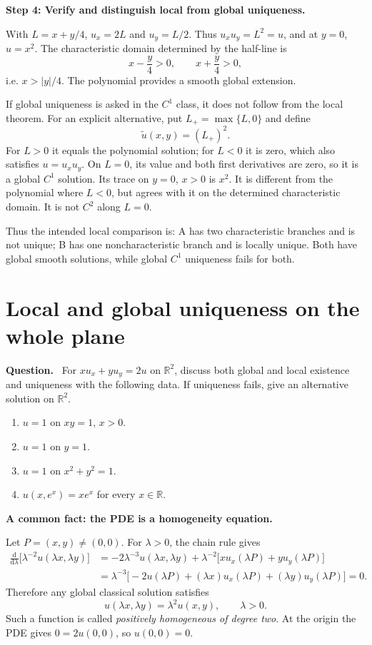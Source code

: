 \documentclass[11pt,a4paper]{article}
\newcommand{\R}{\mathbb R}
\newcommand{\step}[1]{\par\medskip\textbf{#1}\par}
\newenvironment{question}{\par\smallskip\begingroup\color{ink}\textbf{Question.}\ }{\par\endgroup\medskip}
\newcommand{\problem}[1]{\clearpage\section{#1}}
\begin{document}
\step{Step 4: Verify and distinguish local from global uniqueness.}
With $L=x+y/4$, $u_x=2L$ and $u_y=L/2$. Thus $u_xu_y=L^2=u$, and at $y=0$, $u=x^2$. The characteristic domain determined by the half-line is
\[
 x-\frac y4>0,\qquad x+\frac y4>0,
\]
i.e. $x>|y|/4$. The polynomial provides a smooth global extension.

If global uniqueness is asked in the $C^1$ class, it does not follow from the local theorem. For an explicit alternative, put $L_+=\max\{L,0\}$ and define
\[
 \widetilde u(x,y)=(L_+)^2.
\]
For $L>0$ it equals the polynomial solution; for $L<0$ it is zero, which also satisfies $u=u_xu_y$. On $L=0$, its value and both first derivatives are zero, so it is a global $C^1$ solution. Its trace on $y=0$, $x>0$ is $x^2$. It is different from the polynomial where $L<0$, but agrees with it on the determined characteristic domain. It is not $C^2$ along $L=0$.

Thus the intended local comparison is: A has two characteristic branches and is not unique; B has one noncharacteristic branch and is locally unique. Both have global smooth solutions, while global $C^1$ uniqueness fails for both.

\problem{Local and global uniqueness on the whole plane}
\begin{question}
For $xu_x+yu_y=2u$ on $\R^2$, discuss both global and local existence and uniqueness with the following data. If uniqueness fails, give an alternative solution on $\R^2$.
\begin{enumerate}[label=(\alph*)]
\item $u=1$ on $xy=1$, $x>0$.
\item $u=1$ on $y=1$.
\item $u=1$ on $x^2+y^2=1$.
\item $u(x,e^x)=xe^x$ for every $x\in\R$.
\end{enumerate}
\end{question}
\step{A common fact: the PDE is a homogeneity equation.}
Let $P=(x,y)\ne(0,0)$. For $\lambda>0$, the chain rule gives
\begin{align*}
 \frac{\mathrm d}{\mathrm d\lambda}\bigl[\lambda^{-2}u(\lambda x,\lambda y)\bigr]
 &=-2\lambda^{-3}u(\lambda x,\lambda y)
   +\lambda^{-2}\bigl[xu_x(\lambda P)+yu_y(\lambda P)\bigr]\\
 &=\lambda^{-3}\bigl[-2u(\lambda P)
     +(\lambda x)u_x(\lambda P)+(\lambda y)u_y(\lambda P)\bigr]=0.
\end{align*}
Therefore any global classical solution satisfies
\[
 u(\lambda x,\lambda y)=\lambda^2u(x,y),\qquad\lambda>0.
\]
Such a function is called \emph{positively homogeneous of degree two}. At the origin the PDE gives $0=2u(0,0)$, so $u(0,0)=0$.
\end{document}
